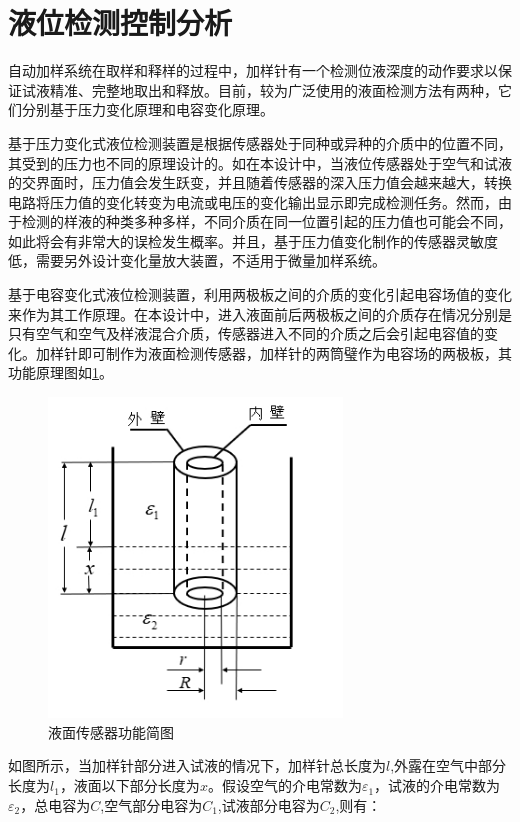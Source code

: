 \section{液位检测控制分析}
自动加样系统在取样和释样的过程中，加样针有一个检测位液深度的动作要求以保证试液精准、完整地取出和释放。目前，较为广泛使用的液面检测方法有两种，它们分别基于压力变化原理和电容变化原理。

基于压力变化式液位检测装置是根据传感器处于同种或异种的介质中的位置不同，其受到的压力也不同的原理设计的。如在本设计中，当液位传感器处于空气和试液的交界面时，压力值会发生跃变，并且随着传感器的深入压力值会越来越大，转换电路将压力值的变化转变为电流或电压的变化输出显示即完成检测任务。然而，由于检测的样液的种类多种多样，不同介质在同一位置引起的压力值也可能会不同，如此将会有非常大的误检发生概率。并且，基于压力值变化制作的传感器灵敏度低，需要另外设计变化量放大装置，不适用于微量加样系统。

基于电容变化式液位检测装置，利用两极板之间的介质的变化引起电容场值的变化来作为其工作原理。在本设计中，进入液面前后两极板之间的介质存在情况分别是只有空气和空气及样液混合介质，传感器进入不同的介质之后会引起电容值的变化。加样针即可制作为液面检测传感器\supercite{bib13}，加样针的两筒璧作为电容场的两极板，其功能原理图如\ref{fig:4-7}。

\begin{figure}[htbp!]
	\centering
	\includegraphics[height=8.5cm]{chap/figure/4-7.jpg}
	\caption{液面传感器功能简图}
	\label{fig:4-7}
\end{figure}

如图所示，当加样针部分进入试液的情况下，加样针总长度为$l$,外露在空气中部分长度为$l_1$，液面以下部分长度为$x$。假设空气的介电常数为${\varepsilon _1}$，试液的介电常数为${\varepsilon _2}$，总电容为$C$,空气部分电容为$C_1$,试液部分电容为$C_2$,则有：

